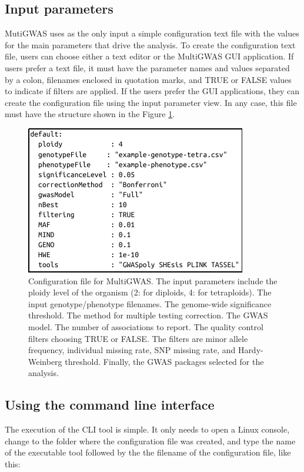 \documentclass{article}
\begin{document}

\subsection{Input parameters}

MutiGWAS uses as the only input a simple configuration text file with the values for the main parameters that drive the analysis. To create the configuration text file, users can choose either a text editor or the MultiGWAS GUI application.  If users prefer a text file, it must have the parameter names and values separated by a colon, filenames enclosed in quotation marks, and TRUE or FALSE values to indicate if filters are applied. If the users prefer the GUI applications, they can create the configuration file using the input parameter view. In any case, this file must have the structure shown in the Figure \ref{fig:Configuration-file}.

\begin{figure}[H]
\begin{centering}
\includegraphics{images/paper-config-file}
\par\end{centering}
\caption{Configuration file for MultiGWAS. The input parameters include the ploidy level of the organism (2: for diploids, 4: for tetraploids). The input genotype/phenotype filenames. The genome-wide significance threshold. The method for multiple testing correction. The GWAS model. The number of associations to report. The quality control filters choosing TRUE or FALSE. The filters are minor allele frequency, individual missing rate, SNP missing rate, and Hardy-Weinberg threshold. Finally, the GWAS packages selected for the analysis.
\label{fig:Configuration-file}}
\end{figure}

\subsection{Using the command line interface}
The execution of the CLI tool is simple. It only needs to open a Linux console, change to the folder where the configuration file was created, and type the name of the executable tool followed by the the filename of the configuration file, like this:
\end{document}
